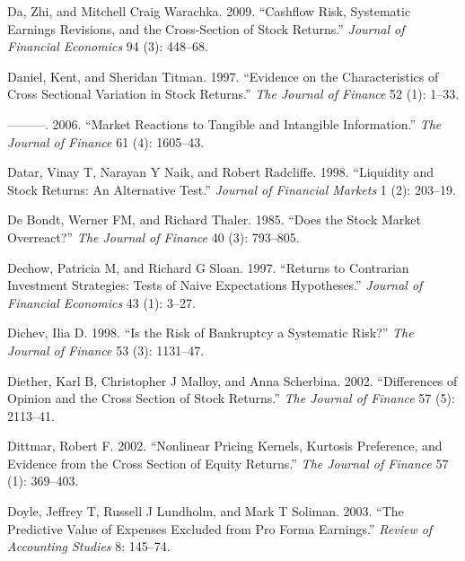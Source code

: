 \documentclass[
  letterpaper,
  DIV=11,
  numbers=noendperiod]{scrreprt}
\newlength{\cslhangindent}
\newlength{\cslentryspacingunit} %
\newenvironment{CSLReferences}[2] %
 {%
  \setlength{\parindent}{0pt}
  \ifodd #1
  \let\oldpar\par
  \def\par{\hangindent=\cslhangindent\oldpar}
  \fi
  \setlength{\parskip}{#2\cslentryspacingunit}
 }%
 {}
\begin{document}
\begin{CSLReferences}{1}{0}
\leavevmode{}%
Da, Zhi, and Mitchell Craig Warachka. 2009. {``Cashflow Risk, Systematic
Earnings Revisions, and the Cross-Section of Stock Returns.''}
\emph{Journal of Financial Economics} 94 (3): 448--68.

\leavevmode{}%
Daniel, Kent, and Sheridan Titman. 1997. {``Evidence on the
Characteristics of Cross Sectional Variation in Stock Returns.''}
\emph{The Journal of Finance} 52 (1): 1--33.

\leavevmode{}%
---------. 2006. {``Market Reactions to Tangible and Intangible
Information.''} \emph{The Journal of Finance} 61 (4): 1605--43.

\leavevmode{}%
Datar, Vinay T, Narayan Y Naik, and Robert Radcliffe. 1998. {``Liquidity
and Stock Returns: An Alternative Test.''} \emph{Journal of Financial
Markets} 1 (2): 203--19.

\leavevmode{}%
De Bondt, Werner FM, and Richard Thaler. 1985. {``Does the Stock Market
Overreact?''} \emph{The Journal of Finance} 40 (3): 793--805.

\leavevmode{}%
Dechow, Patricia M, and Richard G Sloan. 1997. {``Returns to Contrarian
Investment Strategies: Tests of Naive Expectations Hypotheses.''}
\emph{Journal of Financial Economics} 43 (1): 3--27.

\leavevmode{}%
Dichev, Ilia D. 1998. {``Is the Risk of Bankruptcy a Systematic Risk?''}
\emph{The Journal of Finance} 53 (3): 1131--47.

\leavevmode{}%
Diether, Karl B, Christopher J Malloy, and Anna Scherbina. 2002.
{``Differences of Opinion and the Cross Section of Stock Returns.''}
\emph{The Journal of Finance} 57 (5): 2113--41.

\leavevmode{}%
Dittmar, Robert F. 2002. {``Nonlinear Pricing Kernels, Kurtosis
Preference, and Evidence from the Cross Section of Equity Returns.''}
\emph{The Journal of Finance} 57 (1): 369--403.

\leavevmode{}%
Doyle, Jeffrey T, Russell J Lundholm, and Mark T Soliman. 2003. {``The
Predictive Value of Expenses Excluded from Pro Forma Earnings.''}
\emph{Review of Accounting Studies} 8: 145--74.


\end{CSLReferences}
\end{document}
